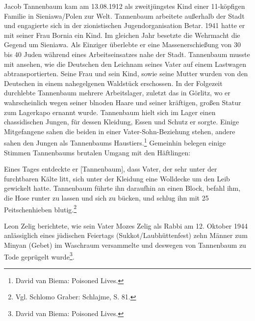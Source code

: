 Jacob Tannenbaum kam am 13.08.1912 als zweitjüngstes Kind einer 11-köpfigen Familie in Sieniawa/Polen zur Welt. Tannenbaum arbeitete außerhalb der Stadt und engagierte sich in der zionistischen Jugendorganisation Betar. 1941 hatte er mit seiner Frau Bornia ein Kind. Im gleichen Jahr besetzte die Wehrmacht die Gegend um Sieniawa. Als Einziger überlebte er eine Massenerschießung von 30 bis 40 Juden während eines Arbeitseinsatzes nahe der Stadt. Tannenbaum musste mit ansehen, wie die Deutschen den Leichnam seines Vater auf einem Lastwagen abtransportierten. Seine Frau und sein Kind, sowie seine Mutter wurden von den Deutschen in einem nahegelgenen Waldstück erschossen. In der Folgezeit durchlebte Tannenbaum mehrere Arbeitslager, zuletzt das in Görlitz, wo er wahrscheinlich wegen seiner blnoden Haare und seiner kräftigen, großen Statur zum Lagerkapo ernannt wurde.
Tannenbaum hielt sich im Lager einen chassidischen Jungen, für dessen Kleidung, Essen und Schutz er sorgte. Einige Mitgefangene sahen die beiden in einer Vater-Sohn-Beziehung stehen, andere sahen den Jungen als Tannenbaums Haustiers.\footnote{﻿David van Biema: Poisoned Lives.}
Gemeinhin belegen einige Stimmen Tannenbaums brutalen Umgang mit den Häftlingen:
\begin{leftbar}
Eines Tages entdeckte er [Tannenbaum], dass Vater, der sehr unter der furchtbaren Kälte litt, sich unter der Kleidung eine Wolldecke um den Leib gewickelt hatte. Tannenbaum führte ihn daraufhin an einen Block, befahl ihm, die Hose runter zu lassen und sich zu bücken, und schlug ihn mit 25 Peitschenhieben blutig.\footnote{Vgl. Schlomo Graber: Schlajme, S. 81.}
\end{leftbar}
Leon Zelig berichtete, wie sein Vater Mozes Zelig als Rabbi am 12. Oktober 1944 anlässiglich eines jüdischen Feiertags (Sukkot/Laubhüttenfest) zehn Männer zum Minyan (Gebet) im Waschraum versammelte und deswegen von Tannenbaum zu Tode geprügelt wurde\footnote{﻿David van Biema: Poisoned Lives.}.


